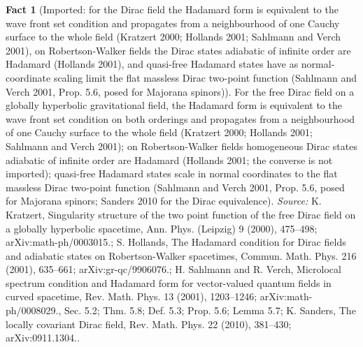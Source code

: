 \documentclass[11pt]{article}
\theoremstyle{definition}
\newtheorem{fact}[theorem]{Fact}
\theoremstyle{plain}
\begin{document}
\begin{fact}[Imported: for the Dirac field the Hadamard form is equivalent to the wave front set condition and propagates from a neighbourhood of one Cauchy surface to the whole field (Kratzert 2000; Hollands 2001; Sahlmann and Verch 2001), on Robertson-Walker fields the Dirac states adiabatic of infinite order are Hadamard (Hollands 2001), and quasi-free Hadamard states have as normal-coordinate scaling limit the flat massless Dirac two-point function (Sahlmann and Verch 2001, Prop. 5.6, posed for Majorana spinors)]\label{c:synthesis.imported-dirac-hadamard-form-propagates-and-adiabatic-states-are-hadamard}
For the free Dirac field on a globally hyperbolic gravitational field, the Hadamard form is equivalent to the wave front set condition on both orderings and propagates from a neighbourhood of one Cauchy surface to the whole field (Kratzert 2000; Hollands 2001; Sahlmann and Verch 2001); on Robertson-Walker fields homogeneous Dirac states adiabatic of infinite order are Hadamard (Hollands 2001; the converse is not imported); quasi-free Hadamard states scale in normal coordinates to the flat massless Dirac two-point function (Sahlmann and Verch 2001, Prop. 5.6, posed for Majorana spinors; Sanders 2010 for the Dirac equivalence).
\emph{Source:} K. Kratzert, Singularity structure of the two point function of the free Dirac field on a globally hyperbolic spacetime, Ann. Phys. (Leipzig) 9 (2000), 475--498; arXiv:math-ph/0003015.; S. Hollands, The Hadamard condition for Dirac fields and adiabatic states on Robertson-Walker spacetimes, Commun. Math. Phys. 216 (2001), 635--661; arXiv:gr-qc/9906076.; H. Sahlmann and R. Verch, Microlocal spectrum condition and Hadamard form for vector-valued quantum fields in curved spacetime, Rev. Math. Phys. 13 (2001), 1203--1246; arXiv:math-ph/0008029., Sec. 5.2; Thm. 5.8; Def. 5.3; Prop. 5.6; Lemma 5.7; K. Sanders, The locally covariant Dirac field, Rev. Math. Phys. 22 (2010), 381--430; arXiv:0911.1304..
\end{fact}
\end{document}
